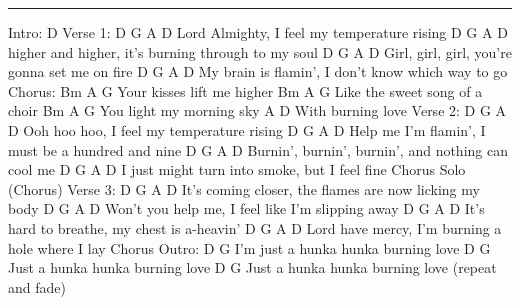 \noindent\rule{\columnwidth}{1pt}

\begin{lstsong}
Intro: D
Verse 1:
D                G       A           D
Lord Almighty, I feel my temperature rising
D                  G            A             D
higher and higher, it's burning through to my soul
D                 G            A         D
Girl, girl, girl, you're gonna set me on fire
D                    G            A            D
My brain is flamin', I don't know which way to go
Chorus:
     Bm      A      G
Your kisses lift me higher
         Bm         A    G
Like the sweet song of a choir
    Bm       A       G
You light my morning sky
     A       D
With burning love
Verse 2:
D            G         A           D
Ooh hoo hoo, I feel my temperature rising
D                      G         A           D
Help me I'm flamin', I must be a hundred and nine
D                 G            A           D
Burnin', burnin', burnin', and nothing can cool me
D                      G          A      D
I just might turn into smoke, but I feel fine
Chorus
Solo (Chorus)
Verse 3:
D                       G              A          D
It's coming closer, the flames are now licking my body
D                    G             A         D
Won't you help me, I feel like I'm slipping away
D                        G        A       D
It's hard to breathe, my chest is a-heavin'
D                    G         A            D
Lord have mercy, I'm burning a hole where I lay
Chorus
Outro:
           D                   G
I'm just a hunka hunka burning love
        D                   G
Just a hunka hunka burning love
        D                   G
Just a hunka hunka burning love
(repeat and fade)
\end{lstsong}
\newpage
